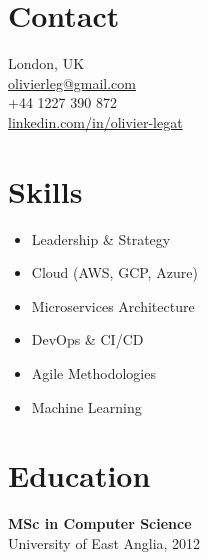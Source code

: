 \documentclass[a4paper,10pt]{article}
\begin{document}
\begin{minipage}[t]{0.32\textwidth}
    \colorbox{darkbg}{%
    \begin{minipage}[t][\textheight]{\dimexpr\textwidth-10pt}
        \raggedright
        \vspace{0.5cm} %

        \color{white} %
        \section*{\color{lightblue} Contact}
         London, UK \\
         \href{mailto:olivierleg@gmail.com}{olivierleg@gmail.com} \\
         +44 1227 390 872 \\
         \href{https://www.linkedin.com/in/olivier-legat}{linkedin.com/in/olivier-legat} \\

        \section*{\color{lightblue} Skills}
        \begin{itemize}[leftmargin=1em, nosep]
            \item Leadership \& Strategy
            \item Cloud (AWS, GCP, Azure)
            \item Microservices Architecture
            \item DevOps \& CI/CD
            \item Agile Methodologies
            \item Machine Learning
        \end{itemize}

        \section*{\color{lightblue} Education}
        \textbf{MSc in Computer Science} \\
        University of East Anglia, 2012
        \vfill %
    \end{minipage}%
    }
\end{minipage}
\end{document}
